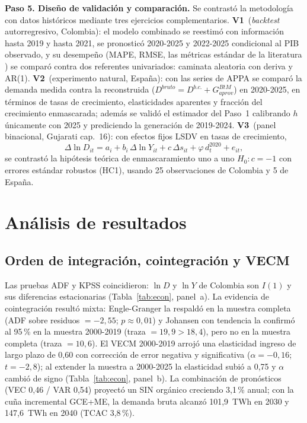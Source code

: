 \documentclass[11pt,letterpaper]{article}
\begin{document}
\textbf{Paso 5. Diseño de validación y comparación.} Se contrastó la
metodología con datos históricos mediante tres ejercicios complementarios.
\textbf{V1}~(\emph{backtest} autorregresivo, Colombia): el modelo combinado
se reestimó con información hasta 2019 y hasta 2021, se pronosticó
2020-2025 y 2022-2025 condicional al PIB observado, y su desempeño (MAPE,
RMSE, las métricas estándar de la literatura \cite{vargas2025}) se comparó
contra dos referentes univariados: caminata aleatoria con deriva y AR(1).
\textbf{V2}~(experimento natural, España): con las series de APPA se comparó
la demanda medida contra la reconstruida
($D^{bruto}=D^{b.c.}+G^{BtM}_{aprov}$) en 2020-2025, en términos de tasas
de crecimiento, elasticidades aparentes y fracción del crecimiento
enmascarada; además se validó el estimador del Paso~1 calibrando $h$ únicamente
con 2025 y prediciendo la generación de 2019-2024. \textbf{V3}~(panel
binacional, Gujarati cap.~16): con efectos fijos LSDV en tasas de
crecimiento,
\begin{equation}
\Delta\ln D_{it} = a_i + b_i\,\Delta\ln Y_{it} + c\,\Delta s_{it} +
\varphi\, d^{2020}_{t} + e_{it},
\label{eq:panel}
\end{equation}
se contrastó la hipótesis teórica de enmascaramiento uno a uno
$H_0\!:c=-1$ con errores estándar robustos (HC1), usando 25 observaciones de
Colombia y 5 de España.

\section{Análisis de resultados}

\subsection{Orden de integración, cointegración y VECM}

Las pruebas ADF y KPSS coincidieron: $\ln D$ y $\ln Y$ de Colombia son
$I(1)$ y sus diferencias estacionarias (Tabla~\ref{tab:econ}, panel~a). La
evidencia de cointegración resultó mixta: Engle-Granger la respaldó en la
muestra completa (ADF sobre residuos $=-2{,}55$; $p\approx0{,}01$) y
Johansen con tendencia la confirmó al 95\,\% en la muestra 2000-2019 (traza
$=19{,}9>18{,}4$), pero no en la muestra completa (traza $=10{,}6$). El VECM
2000-2019 arrojó una elasticidad ingreso de largo plazo de 0,60 con
corrección de error negativa y significativa ($\alpha=-0{,}16$; $t=-2{,}8$);
al extender la muestra a 2000-2025 la elasticidad subió a 0,75 y $\alpha$
cambió de signo (Tabla~\ref{tab:econ}, panel~b). La combinación de
pronósticos (VEC 0,46 / VAR 0,54) proyectó un SIN orgánico creciendo
3,1\,\% anual; con la cuña incremental GCE+ME, la demanda bruta alcanzó
101,9~TWh en 2030 y 147,6~TWh en 2040 (TCAC 3,8\,\%).
\end{document}
